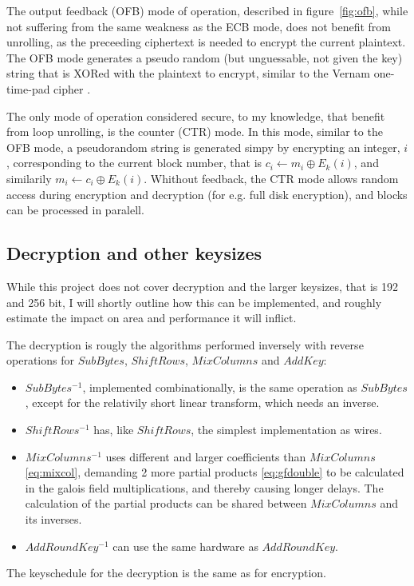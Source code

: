 The output feedback (OFB) mode of operation, described in
figure~\ref{fig:ofb}, while not suffering from the same weakness as
the ECB mode, does not benefit from unrolling, as the preceeding
ciphertext is needed to encrypt the current plaintext. The OFB mode
generates a pseudo random (but unguessable, not given the key) string
that is XORed with the plaintext to encrypt, similar to the Vernam
one-time-pad cipher \cite{vernam}.

The only mode of operation considered secure, to my knowledge, that
benefit from loop unrolling, is the counter (CTR) mode. In this mode,
similar to the OFB mode, a pseudorandom string is generated simpy by
encrypting an integer, $i$, corresponding to the current block number, that
is $c_i \leftarrow m_i \oplus E_k(i)$, and similarily $m_i \leftarrow
c_i \oplus E_k(i)$. Whithout feedback, the CTR mode allows random
access during encryption and decryption (for e.g. full disk
encryption), and blocks can be processed in paralell.

\subsection{Decryption and other keysizes}

While this project does not cover decryption and the larger keysizes,
that is 192 and 256 bit, I will shortly outline how this can be
implemented, and roughly estimate the impact on area and performance
it will inflict.

The decryption is rougly the algorithms performed inversely with
reverse operations for $SubBytes$, $ShiftRows$, $MixColumns$ and
$AddKey$: 
\begin{itemize}
  \item $SubBytes^{-1}$, implemented combinationally, is the same
    operation as $SubBytes$, except for the relativily short linear
    transform, which needs an inverse. 
  \item $ShiftRows^{-1}$ has, like $ShiftRows$, the simplest
    implementation as wires. 
  \item $MixColumns^{-1}$ uses different and larger coefficients
    than $MixColumns$ \eqref{eq:mixcol}, demanding 2 more partial
    products \eqref{eq:gfdouble} to be calculated in the
    galois field multiplications, and thereby causing longer
    delays. The calculation of the partial products can be shared
    between $MixColumns$ and its inverses. 
  \item $AddRoundKey^{-1}$ can use the same hardware as
    $AddRoundKey$. 
\end{itemize}
The keyschedule for the decryption is the same as for encryption.

